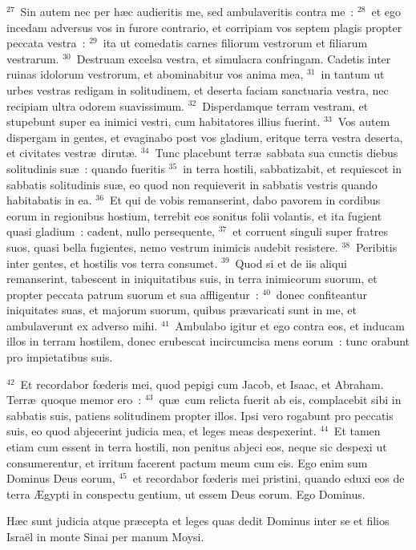${}^{27}$~Sin autem nec per h\ae c audieritis me, sed ambulaveritis contra me~:
${}^{28}$~et ego incedam adversus vos in furore contrario, et corripiam vos septem plagis propter peccata vestra~:
${}^{29}$~ita ut comedatis carnes filiorum vestrorum et filiarum vestrarum.
${}^{30}$~Destruam excelsa vestra, et simulacra confringam. Cadetis inter ruinas idolorum vestrorum, et abominabitur vos anima mea,
${}^{31}$~in tantum ut urbes vestras redigam in solitudinem, et deserta faciam sanctuaria vestra, nec recipiam ultra odorem suavissimum.
${}^{32}$~Disperdamque terram vestram, et stupebunt super ea inimici vestri, cum habitatores illius fuerint.
${}^{33}$~Vos autem dispergam in gentes, et evaginabo post vos gladium, eritque terra vestra deserta, et civitates vestr\ae\ dirut\ae .
${}^{34}$~Tunc placebunt terr\ae\ sabbata sua cunctis diebus solitudinis su\ae~: quando fueritis
${}^{35}$~in terra hostili, sabbatizabit, et requiescet in sabbatis solitudinis su\ae , eo quod non requieverit in sabbatis vestris quando habitabatis in ea.
${}^{36}$~Et qui de vobis remanserint, dabo pavorem in cordibus eorum in regionibus hostium, terrebit eos sonitus folii volantis, et ita fugient quasi gladium~: cadent, nullo persequente,
${}^{37}$~et corruent singuli super fratres suos, quasi bella fugientes, nemo vestrum inimicis audebit resistere.
${}^{38}$~Peribitis inter gentes, et hostilis vos terra consumet.
${}^{39}$~Quod si et de iis aliqui remanserint, tabescent in iniquitatibus suis, in terra inimicorum suorum, et propter peccata patrum suorum et sua affligentur~:
${}^{40}$~donec confiteantur iniquitates suas, et majorum suorum, quibus pr\ae varicati sunt in me, et ambulaverunt ex adverso mihi.
${}^{41}$~Ambulabo igitur et ego contra eos, et inducam illos in terram hostilem, donec erubescat incircumcisa mens eorum~: tunc orabunt pro impietatibus suis.


${}^{42}$~Et recordabor fœderis mei, quod pepigi cum Jacob, et Isaac, et Abraham. Terr\ae\ quoque memor ero~:
${}^{43}$~qu\ae\ cum relicta fuerit ab eis, complacebit sibi in sabbatis suis, patiens solitudinem propter illos. Ipsi vero rogabunt pro peccatis suis, eo quod abjecerint judicia mea, et leges meas despexerint.
${}^{44}$~Et tamen etiam cum essent in terra hostili, non penitus abjeci eos, neque sic despexi ut consumerentur, et irritum facerent pactum meum cum eis. Ego enim sum Dominus Deus eorum,
${}^{45}$~et recordabor fœderis mei pristini, quando eduxi eos de terra \AE gypti in conspectu gentium, ut essem Deus eorum. Ego Dominus.

 H\ae c sunt judicia atque pr\ae cepta et leges quas dedit Dominus inter se et filios Isra\"el in monte Sinai per manum Moysi.

